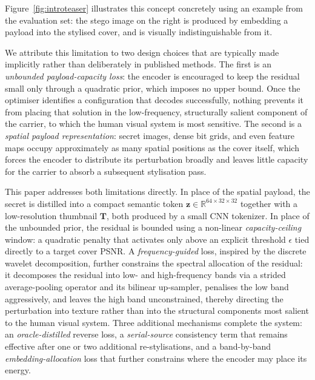 \documentclass[conference]{IEEEtran}
\begin{document}
Figure~\ref{fig:introteaser} illustrates this concept concretely using an example from the evaluation set: the stego image on the right is produced by embedding a payload into the stylised cover, and is visually indistinguishable from it.

We attribute this limitation to two design choices that are typically made implicitly rather than deliberately in published methods. The first is an \emph{unbounded payload-capacity loss}: the encoder is encouraged to keep the residual small only through a quadratic prior, which imposes no upper bound. Once the optimiser identifies a configuration that decodes successfully, nothing prevents it from placing that solution in the low-frequency, structurally salient component of the carrier, to which the human visual system is most sensitive. The second is a \emph{spatial payload representation}: secret images, dense bit grids, and even feature maps occupy approximately as many spatial positions as the cover itself, which forces the encoder to distribute its perturbation broadly and leaves little capacity for the carrier to absorb a subsequent stylisation pass.

This paper addresses both limitations directly. In place of the spatial payload, the secret is distilled into a compact semantic token $\mathbf{z}\!\in\!\mathbb{R}^{64\times32\times32}$ together with a low-resolution thumbnail $\mathbf{T}$, both produced by a small CNN tokenizer. In place of the unbounded prior, the residual is bounded using a non-linear \emph{capacity-ceiling} window: a quadratic penalty that activates only above an explicit threshold $\epsilon$ tied directly to a target cover PSNR. A \emph{frequency-guided} loss, inspired by the discrete wavelet decomposition, further constrains the spectral allocation of the residual: it decomposes the residual into low- and high-frequency bands via a strided average-pooling operator and its bilinear up-sampler, penalises the low band aggressively, and leaves the high band unconstrained, thereby directing the perturbation into texture rather than into the structural components most salient to the human visual system. Three additional mechanisms complete the system: an \emph{oracle-distilled} reverse loss, a \emph{serial-source} consistency term that remains effective after one or two additional re-stylisations, and a band-by-band \emph{embedding-allocation} loss that further constrains where the encoder may place its energy.
\end{document}
